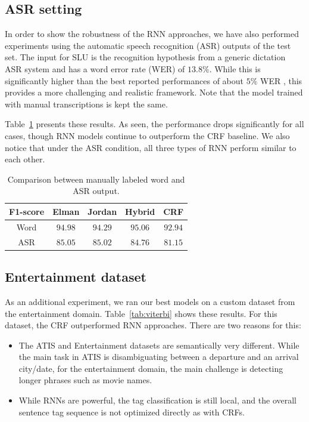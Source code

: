 \subsection{ASR setting}

In order to show the robustness of the RNN approaches, we have also performed
experiments using the automatic speech recognition (ASR) outputs of the test
set. The input for SLU is the recognition hypothesis from a generic dictation
ASR system and has a word error rate (WER) of $13.8\%$. While this is
significantly higher than the best reported performances of about $5\%$ WER \citep{rnn4},
this provides a more challenging and realistic framework. Note that the model
trained with manual transcriptions is kept the same.


Table~\ref{tab:asr} presents these results. As seen, the performance drops significantly
for all cases, though RNN models continue to outperform the CRF baseline. We
also notice that under the ASR condition, all three types of RNN perform
similar to each other.

\begin{table}
\centering
\begin{tabular}{|c|c|c|c|c|}
\hline
F1-score &   Elman &  Jordan &  Hybrid & CRF \\
\hline
Word    & $94.98$ &  $94.29$ &  $95.06$ &  $92.94$ \\
ASR & $85.05$ &   $85.02$  & $84.76$ &   $81.15$ \\
\hline
\end{tabular}
\caption[Comparison with ASR output]{Comparison between manually labeled word and ASR output.}
\label{tab:asr}
\end{table}


\subsection{Entertainment dataset}

As an additional experiment, we ran our best models on a custom dataset from
the entertainment domain. Table~\ref{tab:viterbi} shows these results. For this
dataset, the CRF outperformed RNN approaches. There are two reasons for this:

\begin{itemize}

\item   The ATIS and Entertainment datasets are semantically very different.
While the main task in ATIS is disambiguating between a departure and an
arrival city/date, for the entertainment domain, the main challenge is
detecting longer phrases such as movie names.

\item   While RNNs are powerful, the tag classification is still local, and the
overall sentence tag sequence is not optimized directly as with CRFs.

\end{itemize}

